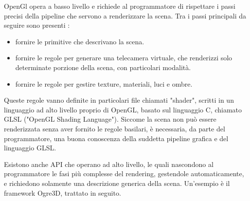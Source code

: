 OpenGl opera a basso livello e richiede al programmatore di rispettare i passi precisi della pipeline che servono a renderizzare la scena. Tra i passi principali da seguire sono presenti :

\begin{itemize}
\item fornire le primitive che descrivano la scena.
\item fornire le regole per generare una telecamera virtuale, che renderizzi solo determinate porzione della scena, con particolari modalità.
\item fornire le regole per gestire texture, materiali, luci e ombre.
\end{itemize}

Queste regole vanno definite in particolari file chiamati "shader", scritti in un linguaggio ad alto livello proprio di OpenGL, basato sul linguaggio C, chiamato GLSL ("OpenGL Shading Language"). Siccome la scena non può essere renderizzata senza aver fornito le regole basilari, è necessaria, da parte del programmatore, una buona conoscenza della suddetta pipeline grafica e del linguaggio GLSL.

Esistono anche API che operano ad alto livello, le quali nascondono al programmatore le fasi più complesse del rendering, gestendole automaticamente, e richiedono solamente una descrizione generica della scena. Un'esempio è il framework Ogre3D, trattato in seguito.
